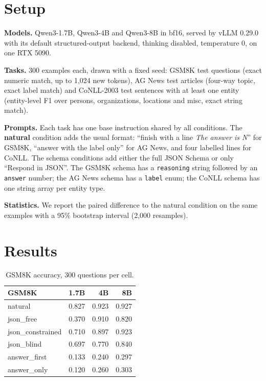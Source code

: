 \documentclass[10pt,twocolumn]{article}
\begin{document}
\section{Setup}

\textbf{Models.} Qwen3-1.7B, Qwen3-4B and Qwen3-8B \cite{qwen3} in bf16, served by vLLM 0.29.0 with its default
structured-output backend, thinking disabled, temperature 0, on one RTX 5090.

\textbf{Tasks.} 300 examples each, drawn with a fixed seed: GSM8K \cite{gsm8k} test questions (exact numeric match,
up to 1,024 new tokens), AG News test articles (four-way topic, exact label match) and CoNLL-2003 test sentences with
at least one entity (entity-level F1 over persons, organizations, locations and misc, exact string match).

\textbf{Prompts.} Each task has one base instruction shared by all conditions. The \textbf{natural} condition adds
the usual format: ``finish with a line \emph{The answer is N}'' for GSM8K, ``answer with the label only'' for AG
News, and four labelled lines for CoNLL. The schema conditions add either the full JSON Schema or only ``Respond in
JSON''. The GSM8K schema has a \texttt{reasoning} string followed by an \texttt{answer} number; the AG News schema has a
\texttt{label} enum; the CoNLL schema has one string array per entity type.

\textbf{Statistics.} We report the paired difference to the natural condition on the same examples with a 95\%
bootstrap interval (2,000 resamples).

\section{Results}

\begin{table}[t]
\centering\small
\begin{tabular}{lrrr}
\toprule
GSM8K & 1.7B & 4B & 8B \\
\midrule
natural & 0.827 & 0.923 & 0.927 \\
json\_free & 0.370 & 0.910 & 0.820 \\
json\_constrained & 0.710 & 0.897 & 0.923 \\
json\_blind & 0.697 & 0.770 & 0.840 \\
answer\_first & 0.133 & 0.240 & 0.297 \\
answer\_only & 0.120 & 0.260 & 0.303 \\
\bottomrule
\end{tabular}
\caption{GSM8K accuracy, 300 questions per cell.}
\label{tab:gsm}
\end{table}
\end{document}
